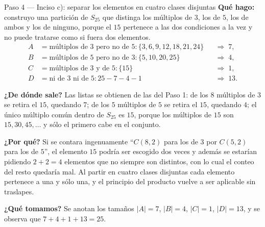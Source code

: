 \documentclass[11pt]{article}
\begin{document}
\begin{paso}{Paso 4 --- Inciso c): separar los elementos en cuatro clases disjuntas}
\textbf{Qué hago:} construyo una partición de $S_{25}$ que distinga los múltiplos de $3$, los de $5$, los de ambos y los de ninguno, porque el $15$ pertenece a las dos condiciones a la vez y no puede tratarse como si fuera dos elementos.
\begin{align*}
  A&=\text{múltiplos de }3\text{ pero no de }5: \{3,6,9,12,18,21,24\} &&\Rightarrow\; 7,\\
  B&=\text{múltiplos de }5\text{ pero no de }3: \{5,10,20,25\} &&\Rightarrow\; 4,\\
  C&=\text{múltiplos de }3\text{ y de }5: \{15\} &&\Rightarrow\; 1,\\
  D&=\text{ni de }3\text{ ni de }5: 25-7-4-1 &&\Rightarrow\; 13 .
\end{align*}

\textbf{¿De dónde sale?} Las listas se obtienen de las del Paso 1: de los $8$ múltiplos de $3$ se retira el $15$, quedando $7$; de los $5$ múltiplos de $5$ se retira el $15$, quedando $4$; el único múltiplo común dentro de $S_{25}$ es $15$, porque los múltiplos de $15$ son $15,30,45,\dots$ y sólo el primero cabe en el conjunto.

\textbf{¿Por qué?} Si se contara ingenuamente ``$C(8,2)$ para los de $3$ por $C(5,2)$ para los de $5$'', el elemento $15$ podría ser escogido dos veces y además se estarían pidiendo $2+2=4$ elementos que no siempre son distintos, con lo cual el conteo del resto quedaría mal. Al partir en cuatro clases disjuntas cada elemento pertenece a una y sólo una, y el principio del producto vuelve a ser aplicable sin traslapes.

\textbf{¿Qué tomamos?} Se anotan los tamaños $|A|=7$, $|B|=4$, $|C|=1$, $|D|=13$, y se observa que $7+4+1+13=25$.
\end{paso}
\end{document}
